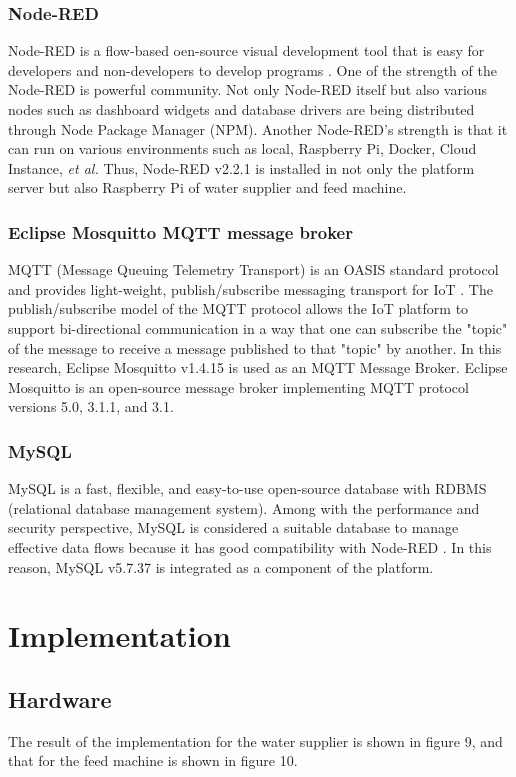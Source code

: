 \documentclass[conference]{IEEEtran}
\begin{document}
\subsubsection{Node-RED}
Node-RED is a flow-based oen-source visual development tool that is easy for developers and non-developers to develop programs \cite{b17}.
One of the strength of the Node-RED is powerful community. Not only Node-RED itself but also various nodes such as dashboard widgets and database drivers are being distributed through Node Package Manager (NPM).
Another Node-RED’s strength is that it can run on various environments such as local, Raspberry Pi, Docker, Cloud Instance, \textit{et al.} Thus, Node-RED v2.2.1 is installed in not only the platform server but also Raspberry Pi of water supplier and feed machine.

\subsubsection{Eclipse Mosquitto MQTT message broker}
MQTT (Message Queuing Telemetry Transport) is an OASIS standard protocol and provides light-weight, publish/subscribe messaging transport for IoT \cite{b9}.
The publish/subscribe model of the MQTT protocol allows the IoT platform to support bi-directional communication in a way that one can subscribe the "topic" of the message to receive a message published to that "topic" by another.
In this research, Eclipse Mosquitto v1.4.15 is used as an MQTT Message Broker.
Eclipse Mosquitto is an open-source message broker implementing MQTT protocol versions 5.0, 3.1.1, and 3.1\cite{b20}. 

\subsubsection{MySQL}
MySQL is a fast, flexible, and easy-to-use open-source database with RDBMS (relational database management system).
Among with the performance and security perspective, MySQL is considered a suitable database to manage effective data flows because it has good compatibility with Node-RED \cite{b21}.
In this reason, MySQL v5.7.37 is integrated as a component of the platform.

\section{Implementation}

\subsection{Hardware}
The result of the implementation for the water supplier is shown in figure 9, and that for the feed machine is shown in figure 10.
\end{document}

